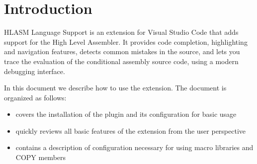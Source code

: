 \section*{Introduction}

HLASM Language Support is an extension for Visual Studio Code that adds support for the High Level Assembler. It provides code completion, highlighting and navigation features, detects common mistakes in the source, and lets you trace the evaluation of the conditional assembly source code, using a modern debugging interface.

In this document we describe how to use the extension. The document is organized as follows:
\begin{itemize}
\item{} covers the installation of the plugin and its configuration for basic usage
\item{} quickly reviews all basic features of the extension from the user perspective
\item{} contains a description of configuration necessary for using macro libraries and COPY members
\end{itemize}
